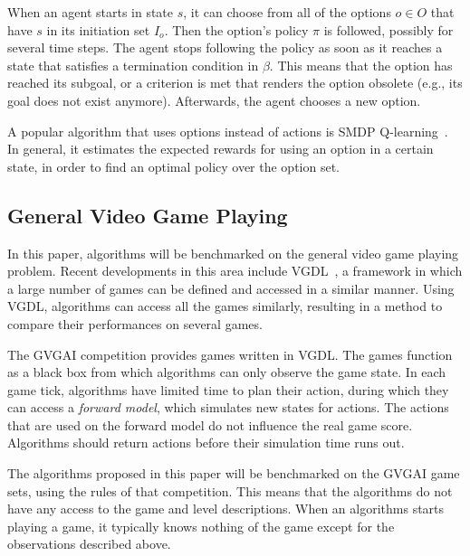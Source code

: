 When an agent starts in state $s$, it can choose from all of the options $o \in
O$ that have $s$ in its initiation set $I_o$. Then the option's policy $\pi$ is
followed, possibly for several time steps. The agent stops following the policy
as soon as it reaches a state that satisfies a termination condition in $\beta$.
This means that the option has reached its subgoal, or a criterion is met that
renders the option obsolete (e.g., its goal does not exist anymore).
Afterwards, the agent chooses a new option.

A popular algorithm that uses options instead of actions is SMDP
Q-learning~\cite{sutton1999between}. In general, it estimates the expected
rewards for using an option in a certain state, in order to find an optimal
policy over the option set.

\subsection{General Video Game Playing}
\label{subsec:vgdl}
In this paper, algorithms will be benchmarked on the general video game playing
problem. Recent developments in this area include VGDL~\cite{schaul2013video}, a
framework in which a large number of games can be defined and accessed in a
similar manner.  Using VGDL, algorithms can access all the games similarly,
resulting in a method to compare their performances on several games.

The GVGAI competition provides games written in VGDL\@.  The games function as a
black box from which algorithms can only observe the game state. In each game
tick, algorithms have limited time to plan their action, during which they can
access a \emph{forward model}, which simulates new states for actions. The
actions that are used on the forward model do not influence the real game score.
Algorithms should return actions before their simulation time runs out.

The algorithms proposed in this paper will be benchmarked on the GVGAI game
sets, using the rules of that competition. This means that the algorithms do not
have any access to the game and level descriptions. When an algorithms starts
playing a game, it typically knows nothing of the game except for the
observations described above.
